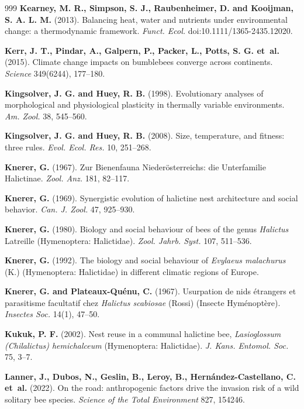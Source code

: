 \documentclass[11pt,a4paper]{article}
\begin{document}
\begin{thebibliography}{999}
\textbf{Kearney, M. R., Simpson, S. J., Raubenheimer, D. and Kooijman, S. A. L. M.} (2013).
Balancing heat, water and nutrients under environmental change: a thermodynamic framework.
\textit{Funct. Ecol.} doi:10.1111/1365-2435.12020.

\textbf{Kerr, J. T., Pindar, A., Galpern, P., Packer, L., Potts, S. G. et~al.} (2015).
Climate change impacts on bumblebees converge across continents.
\textit{Science} 349(6244), 177--180.

\textbf{Kingsolver, J. G. and Huey, R. B.} (1998).
Evolutionary analyses of morphological and physiological plasticity in thermally variable environments.
\textit{Am. Zool.} 38, 545--560.

\textbf{Kingsolver, J. G. and Huey, R. B.} (2008).
Size, temperature, and fitness: three rules.
\textit{Evol. Ecol. Res.} 10, 251--268.

\textbf{Knerer, G.} (1967).
Zur Bienenfauna Niederösterreichs: die Unterfamilie Halictinae.
\textit{Zool. Anz.} 181, 82--117.

\textbf{Knerer, G.} (1969).
Synergistic evolution of halictine nest architecture and social behavior.
\textit{Can. J. Zool.} 47, 925--930.

\textbf{Knerer, G.} (1980).
Biology and social behaviour of bees of the genus \textit{Halictus} Latreille (Hymenoptera: Halictidae).
\textit{Zool. Jahrb. Syst.} 107, 511--536.

\textbf{Knerer, G.} (1992). The biology and social behaviour of \textit{Evylaeus malachurus} (K.) (Hymenoptera: Halictidae) in different climatic regions of Europe.

\textbf{Knerer, G. and Plateaux-Quénu, C.} (1967).
Usurpation de nids étrangers et parasitisme facultatif chez \textit{Halictus scabiosae} (Rossi) (Insecte Hyménoptère).
\textit{Insectes Soc.} 14(1), 47--50.

\textbf{Kukuk, P. F.} (2002). Nest reuse in a communal halictine bee, \textit{Lasioglossum (Chilalictus) hemichalceum} (Hymenoptera: Halictidae). \textit{J. Kans. Entomol. Soc.} 75, 3--7.

\textbf{Lanner, J., Dubos, N., Geslin, B., Leroy, B., Hernández-Castellano, C. et~al.} (2022).
On the road: anthropogenic factors drive the invasion risk of a wild solitary bee species.
\textit{Science of the Total Environment} 827, 154246.


\end{thebibliography}
\end{document}
